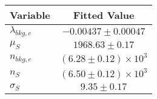 \begin{tabular}[t]{lc}
\hline
Variable &Fitted Value\\
\hline\hline
$\lambda_{bkg,c}$&$-0.00437\pm0.00047$\\
\hline
$\mu_{S}$&$1968.63\pm0.17$\\
\hline
$n_{bkg,c}$&$(6.28\pm0.12)\times 10^3$\\
\hline
$n_{S}$&$(6.50\pm0.12)\times 10^3$\\
\hline
$\sigma_{S}$&$9.35\pm0.17$\\
\hline
\end{tabular}